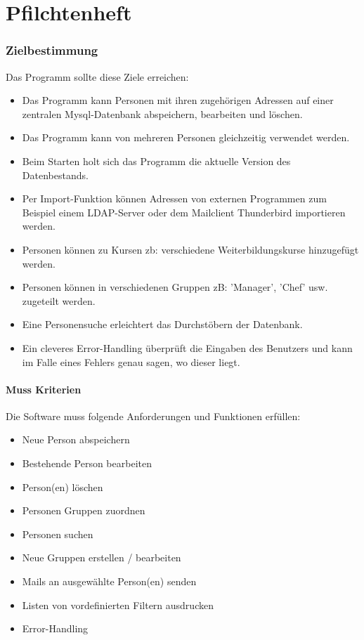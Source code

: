 \part{Pfilchtenheft}
\newpage
\section{Zielbestimmung}
Das Programm sollte diese Ziele erreichen:
%
\begin{itemize}
\item Das Programm kann Personen mit ihren zugehörigen Adressen auf einer
zentralen Mysql-Datenbank abspeichern, bearbeiten und löschen.
\item Das Programm kann von mehreren Personen gleichzeitig verwendet werden.
\item Beim Starten holt sich das Programm die aktuelle Version des Datenbestands.
\item Per Import-Funktion können Adressen von externen Programmen zum
Beispiel einem LDAP-Server oder dem Mailclient Thunderbird importieren
werden.
\item Personen können zu Kursen zb: verschiedene Weiterbildungskurse
hinzugefügt werden.
\item Personen können in verschiedenen Gruppen zB: 'Manager', 'Chef' usw.
zugeteilt werden.
\item Eine Personensuche erleichtert das Durchstöbern der Datenbank.
\item Ein cleveres Error-Handling überprüft die Eingaben des Benutzers und kann
im Falle eines Fehlers genau sagen, wo dieser liegt.
\end{itemize}
%
\subsection{Muss Kriterien}
Die Software muss folgende Anforderungen und Funktionen erfüllen:

\begin{itemize}
\item Neue Person abspeichern
\item Bestehende Person bearbeiten
\item Person(en) löschen
\item Personen Gruppen zuordnen
\item Personen suchen
\item Neue Gruppen erstellen / bearbeiten
\item Mails an ausgewählte Person(en) senden
\item Listen von vordefinierten Filtern ausdrucken
\item Error-Handling
\end{itemize}
%
